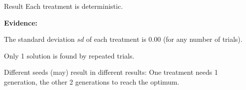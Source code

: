 \begin{frame}
\vspace*{2mm}
\begin{block}{
Result
}
Each treatment is deterministic.
 
{\bf Evidence:}
 
The standard deviation $sd$ of each treatment is $0.00$
(for any number of trials).
 
Only 1 solution is found by repeated trials.
 
Different seeds (may) result in different results:
One treatment needs 1 generation, the other 2 generations to reach the optimum.
\end{block}
\end{frame}